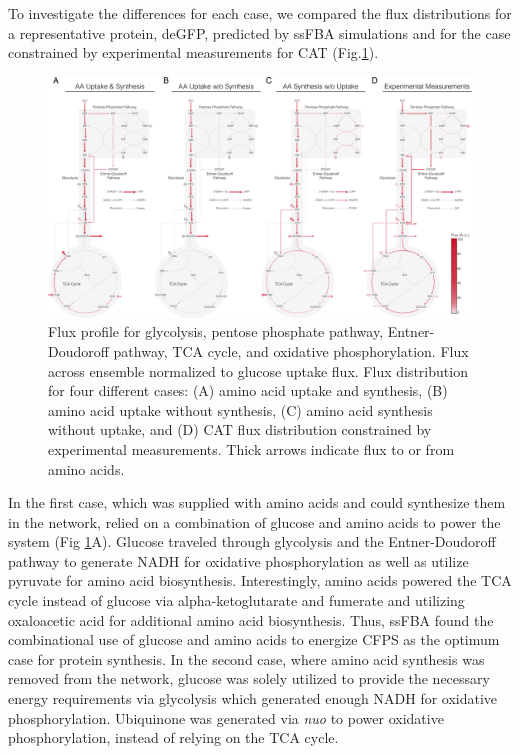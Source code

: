 \documentclass[journal=asbcd6,manuscript=article]{achemso}
\begin{document}
To investigate the differences for each case, we compared the flux distributions for a representative protein, deGFP, predicted by ssFBA simulations and for the case constrained by experimental measurements for CAT (Fig.\ref{fig:flux}).
\begin{figure}[t!]
\includegraphics[width=1.00\textwidth]{./Figures/Flux_all.pdf}
\caption{Flux profile for glycolysis, pentose phosphate pathway, Entner-Doudoroff pathway, TCA cycle, and oxidative phosphorylation. Flux across ensemble normalized to glucose uptake flux. Flux distribution for four different cases: (A) amino acid uptake and synthesis, (B) amino acid uptake without synthesis, (C) amino acid synthesis without uptake, and (D) CAT flux distribution constrained by experimental measurements. Thick arrows indicate flux to or from amino acids.}
\label{fig:flux}
\end{figure}
In the first case, which was supplied with amino acids and could synthesize them in the network, relied on a combination of glucose and amino acids to power the system (Fig \ref{fig:flux}A).
Glucose traveled through glycolysis and the Entner-Doudoroff pathway to generate NADH for oxidative phosphorylation as well as utilize pyruvate for amino acid biosynthesis. 
Interestingly, amino acids powered the TCA cycle instead of glucose via alpha-ketoglutarate and fumerate and utilizing oxaloacetic acid for additional amino acid biosynthesis.
Thus, ssFBA found the combinational use of glucose and amino acids to energize CFPS as the optimum case for protein synthesis. 
In the second case, where amino acid synthesis was removed from the network, glucose was solely utilized to provide the necessary energy requirements via glycolysis which generated enough NADH for oxidative phosphorylation.
Ubiquinone was generated via \textit{nuo} to power oxidative phosphorylation, instead of relying on the TCA cycle. 
\end{document}
